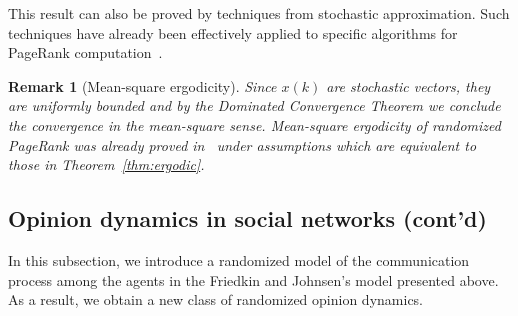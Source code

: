 \documentclass{IEEEtran}
\newtheorem{remark}{Remark}
\newcommand{\1}{\mathbf{1}} \newcommand{\ind}{\mathds{1}}
\begin{document}
This result can also be proved by techniques from stochastic approximation. Such techniques have already been effectively applied to specific algorithms for PageRank computation~\cite{DBLP:journals/corr/abs-1305-3178}. 

\begin{remark}[Mean-square ergodicity]\label{rem:ms-pgr}
Since $x(k)$ are stochastic vectors, they are uniformly bounded and by the Dominated Convergence Theorem we conclude the convergence in the mean-square sense. Mean-square ergodicity of randomized PageRank was already proved in~\cite{HI-RT-EWB-FD:09} under assumptions which are equivalent to those in Theorem~\ref{thm:ergodic}.
\end{remark}




\subsection{Opinion dynamics in social networks (cont'd)}
\label{sect:random-friedkin}
In this subsection, we introduce a randomized model of the communication process among the agents in the Friedkin and Johnsen's model presented above. As a result, we obtain a new class of randomized opinion dynamics.
\end{document}
